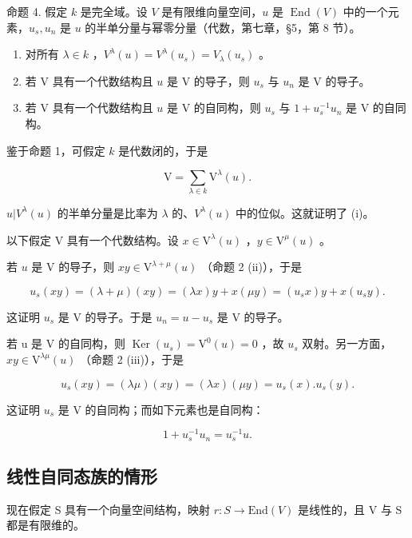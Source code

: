 命题 4. 假定 \(k\) 是完全域。设 \(V\) 是有限维向量空间，\(u\) 是 \(\operatorname{End}(V)\) 中的一个元素，\(u_s, u_n\) 是 \(u\) 的半单分量与幂零分量（代数，第七章，§5，第 8 节）。

\begin{enumerate}
\def\labelenumi{(\roman{enumi})}
\item
  对所有 \(\lambda \in k\) ，\(V^{\lambda}(u) = V^{\lambda}(u_s) = V_{\lambda}(u_s)\) 。
\item
  若 \(\mathrm{V}\) 具有一个代数结构且 \(u\) 是 \(\mathrm{V}\) 的导子，则 \(u_{s}\) 与 \(u_{n}\) 是 \(\mathrm{V}\) 的导子。
\item
  若 \(\mathrm{V}\) 具有一个代数结构且 \(u\) 是 \(\mathrm{V}\) 的自同构，则 \(u_{s}\) 与 \(1 + u_{s}^{-1}u_{n}\) 是 \(\mathrm{V}\) 的自同构。
\end{enumerate}

鉴于命题 1，可假定 \(k\) 是代数闭的，于是

\[
\mathrm{V} = \sum_ {\lambda \in k} \mathrm{V} ^ {\lambda} (u).
\]

\(u|V^{\lambda}(u)\) 的半单分量是比率为 \(\lambda\) 的、\(V^{\lambda}(u)\) 中的位似。这就证明了 (i)。

以下假定 \(\mathrm{V}\) 具有一个代数结构。设 \(x \in \mathrm{V}^{\lambda}(u)\) ，\(y \in \mathrm{V}^{\mu}(u)\) 。

若 \(u\) 是 \(\mathrm{V}\) 的导子，则 \(xy \in \mathrm{V}^{\lambda + \mu}(u)\) （命题 2 (ii)），于是

\[
u _ {s} (x y) = (\lambda + \mu) (x y) = (\lambda x) y + x (\mu y) = (u _ {s} x) y + x (u _ {s} y).
\]

这证明 \(u_{s}\) 是 V 的导子。于是 \(u_{n} = u - u_{s}\) 是 V 的导子。

若 u 是 V 的自同构，则 \(\operatorname{Ker}(u_{s}) = \mathrm{V}^{0}(u) = 0\) ，故 \(u_{s}\) 双射。另一方面，\(xy \in \mathrm{V}^{\lambda\mu}(u)\) （命题 2 (iii)），于是

\[
u _ {s} (x y) = (\lambda \mu) (x y) = (\lambda x) (\mu y) = u _ {s} (x). u _ {s} (y).
\]

这证明 \(u_{s}\) 是 V 的自同构；而如下元素也是自同构：

\[
1 + u _ {s} ^ {- 1} u _ {n} = u _ {s} ^ {- 1} u.
\]

\subsection{线性自同态族的情形}

现在假定 S 具有一个向量空间结构，映射 \(r : S \to \text{End}(V)\) 是线性的，且 V 与 S 都是有限维的。


